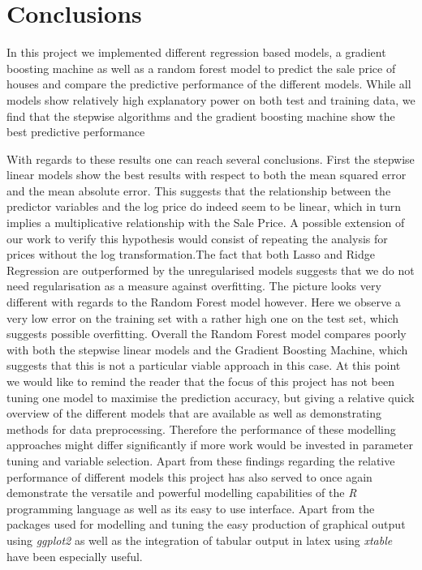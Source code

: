 \section{Conclusions}
In this project we implemented different regression based models, a gradient boosting machine as well as a random forest model to predict the sale price of houses and compare the predictive performance of the different models. 
While all models show relatively high explanatory power on both test and training data, we find that the stepwise algorithms and the gradient boosting machine show the best predictive performance

With regards to these results one can reach several conclusions. First the stepwise linear models show the best results with respect to both the mean squared error and the mean absolute error. This suggests that the relationship between the predictor variables and the log price do indeed seem to be linear, which in turn implies a multiplicative relationship with the Sale Price. A possible extension of our work to verify this hypothesis would consist of repeating the analysis for prices without the log transformation.The fact that both Lasso and Ridge Regression are outperformed by the unregularised models suggests that we do not need regularisation as a measure against overfitting. The picture looks very different with regards to the Random Forest model however. Here we observe a very low error on the training set with a rather high one on the test set, which suggests possible overfitting. Overall the Random Forest model compares poorly with both the stepwise linear models and the Gradient Boosting Machine, which suggests that this is not a particular viable approach in this case. At this point we would like to remind the reader that the focus of this project has not been tuning one model to maximise the prediction accuracy, but giving a relative quick overview of the different models that are available as well as demonstrating methods for data preprocessing. Therefore the performance of these modelling approaches might differ significantly if more work would be invested in parameter tuning and variable selection.
Apart from these findings regarding the relative performance of different models this project has also served to once again demonstrate the versatile and powerful modelling capabilities of the \textit{R} programming language as well as its easy to use interface. Apart from the packages used for modelling and tuning the easy production of graphical output using \textit{ggplot2}  as well as the integration of tabular output in latex using \textit{xtable} have been especially useful. 